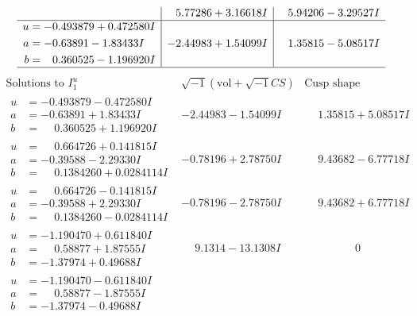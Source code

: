 \documentclass[1p]{elsarticle_modified}
\theoremstyle{definition}
\newcommand{\I}{\sqrt{-1}}
\begin{document}
$$\begin{array}{c|c|c}
 & \phantom{-}5.77286 + 3.16618 I & \phantom{-}5.94206 - 3.29527 I \\ \hline\begin{aligned}
u &= -0.493879 + 0.472580 I \\
a &= -0.63891 - 1.83433 I \\
b &= \phantom{-}0.360525 - 1.196920 I\end{aligned}
 & -2.44983 + 1.54099 I & \phantom{-}1.35815 - 5.08517 I\\
 \hline 
 \end{array}$$\newpage$$\begin{array}{c|c|c}  
\text{Solutions to }I^u_{1}& \I (\text{vol} + \sqrt{-1}CS) & \text{Cusp shape}\\
 \hline 
\begin{aligned}
u &= -0.493879 - 0.472580 I \\
a &= -0.63891 + 1.83433 I \\
b &= \phantom{-}0.360525 + 1.196920 I\end{aligned}
 & -2.44983 - 1.54099 I & \phantom{-}1.35815 + 5.08517 I \\ \hline\begin{aligned}
u &= \phantom{-}0.664726 + 0.141815 I \\
a &= -0.39588 - 2.29330 I \\
b &= \phantom{-}0.1384260 + 0.0284114 I\end{aligned}
 & -0.78196 + 2.78750 I & \phantom{-}9.43682 - 6.77718 I \\ \hline\begin{aligned}
u &= \phantom{-}0.664726 - 0.141815 I \\
a &= -0.39588 + 2.29330 I \\
b &= \phantom{-}0.1384260 - 0.0284114 I\end{aligned}
 & -0.78196 - 2.78750 I & \phantom{-}9.43682 + 6.77718 I \\ \hline\begin{aligned}
u &= -1.190470 + 0.611840 I \\
a &= \phantom{-}0.58877 + 1.87555 I \\
b &= -1.37974 + 0.49688 I\end{aligned}
 & \phantom{-}9.1314 - 13.1308 I & \phantom{-0.000000 } 0 \\ \hline\begin{aligned}
u &= -1.190470 - 0.611840 I \\
a &= \phantom{-}0.58877 - 1.87555 I \\
b &= -1.37974 - 0.49688 I\end{aligned}

\end{array}$$
\end{document}
